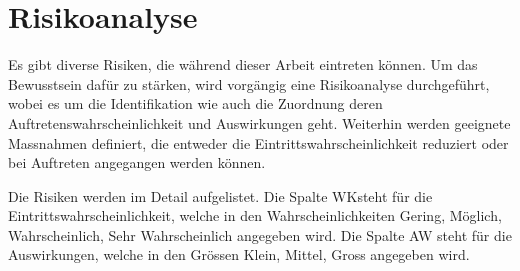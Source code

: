 \newpage
\section{Risikoanalyse}
Es gibt diverse Risiken, die während dieser Arbeit eintreten können. Um das Bewusstsein dafür zu stärken,
wird vorgängig eine Risikoanalyse durchgeführt, wobei es um die Identifikation wie auch die Zuordnung deren
Auftretenswahrscheinlichkeit und Auswirkungen geht. Weiterhin werden geeignete Massnahmen definiert, die entweder
die Eintrittswahrscheinlichkeit reduziert oder bei Auftreten angegangen werden können.

Die Risiken werden im Detail aufgelistet. Die Spalte \glqq WK\grqq steht für die Eintrittswahrscheinlichkeit, welche
in den Wahrscheinlichkeiten \glqq Gering\grqq, \glqq Möglich\grqq, \glqq Wahrscheinlich\grqq, \glqq Sehr Wahrscheinlich\grqq{}
angegeben wird. Die Spalte \glqq AW\grqq{} steht für die Auswirkungen, welche in den Grössen \glqq Klein\grqq, \glqq Mittel\grqq, \glqq Gross\grqq{}
angegeben wird.

